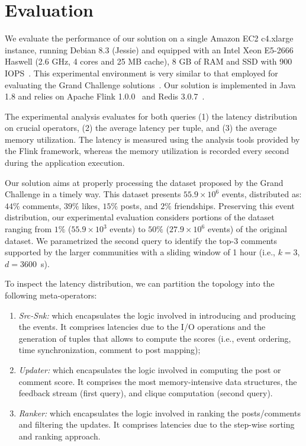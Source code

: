 \section{Evaluation}
\label{sec:evaluation}

We evaluate the performance of our solution on a single Amazon EC2 c4.xlarge instance, running Debian 8.3 (Jessie) and equipped with an Intel Xeon E5-2666 Haswell (2.6 GHz, 4 cores and 25 MB cache), 8 GB of RAM and SSD with 900 IOPS~\cite{AWSEC2InstanceTypes}. This experimental environment is very similar to that employed for evaluating the Grand Challenge solutions~\cite{GrandChallenge:2016}.
%
Our solution is implemented in Java 1.8 and relies on Apache Flink 1.0.0~\cite{Flink} and Redis 3.0.7~\cite{Redis}.

The experimental analysis evaluates for both queries
(1) the latency distribution on crucial operators,
(2) the average latency per tuple,
and (3) the average memory utilization.
%
The latency is measured using the analysis tools provided by the Flink framework, whereas the memory utilization is recorded every second during the application execution.

Our solution aims at properly processing the dataset proposed by the Grand Challenge in a timely way. This dataset presents $ 55.9 \times 10^6 $ events, distributed as: $ 44 \% $ comments, $ 39\% $ likes, $ 15\% $ posts, and $ 2\% $ friendships.
%
Preserving this event distribution, our experimental evaluation considers portions of the dataset ranging from $ 1\% $ ($ 55.9 \times 10^3 $ events) to $ 50\% $ ($ 27.9 \times 10^6 $ events) of the original dataset.
%
We parametrized the second query to identify the top-$3$ comments supported by the larger communities with a sliding window of 1 hour (i.e., $k = 3 $, $d = 3600 $~s).

To inspect the latency distribution, we can partition the topology into the following meta-operators:
\begin{enumerate} \itemsep0em
	\item \textit{Src-Snk:}
	which encapsulates the logic involved in introducing and producing the events. It comprises latencies due to the I/O operations and the generation of tuples that allows to compute the scores (i.e., event ordering, time synchronization, comment to post mapping);
	\item \textit{Updater:}
	which encapsulates the logic involved in computing the post or comment score. It comprises the most memory-intensive data structures, the feedback stream (first query), and clique computation (second query).
	\item \textit{Ranker:}
	which encapsulates the logic involved in ranking the posts/comments and filtering the updates. It comprises latencies due to the step-wise sorting and ranking approach.
\end{enumerate}

